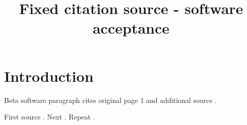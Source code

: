 \documentclass[11pt]{article}
\begin{document}
\title{Fixed citation source - software acceptance}
\maketitle
\section{Introduction}
Beta software paragraph cites original page 1 \citep{evidence_b5348fa59b3948ae9540b75a33ca9bd9} and additional source \citep{evidence_6b169de2b78d452f919391b00916f2c8}.

First source \citep{evidence_6b169de2b78d452f919391b00916f2c8}. Next \citep{evidence_b5348fa59b3948ae9540b75a33ca9bd9}. Repeat \citep{evidence_6b169de2b78d452f919391b00916f2c8}.



\end{document}
